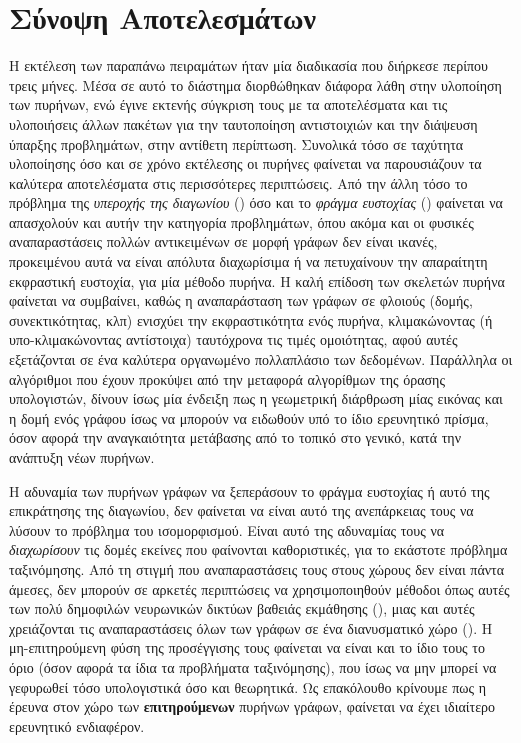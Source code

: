 \section{Σύνοψη Αποτελεσμάτων}
Η εκτέλεση των παραπάνω πειραμάτων ήταν μία διαδικασία που διήρκεσε περίπου τρεις μήνες.
Μέσα σε αυτό το διάστημα διορθώθηκαν διάφορα λάθη στην υλοποίηση των πυρήνων, ενώ έγινε εκτενής σύγκριση τους με τα αποτελέσματα και τις υλοποιήσεις άλλων πακέτων για την ταυτοποίηση αντιστοιχιών και την διάψευση ύπαρξης προβλημάτων, στην αντίθετη περίπτωση.
Συνολικά τόσο σε ταχύτητα υλοποίησης όσο και σε χρόνο εκτέλεσης οι πυρήνες  φαίνεται να παρουσιάζουν τα καλύτερα αποτελέσματα στις περισσότερες περιπτώσεις.
Από την άλλη τόσο το πρόβλημα της \textit{υπεροχής της διαγωνίου} () όσο και το \textit{φράγμα ευστοχίας} () φαίνεται να απασχολούν και αυτήν την κατηγορία προβλημάτων, όπου ακόμα και οι φυσικές αναπαραστάσεις πολλών αντικειμένων σε μορφή γράφων δεν είναι ικανές, προκειμένου αυτά να είναι απόλυτα διαχωρίσιμα ή να πετυχαίνουν την απαραίτητη εκφραστική ευστοχία, για μία μέθοδο πυρήνα.
Η καλή επίδοση των σκελετών πυρήνα φαίνεται να συμβαίνει, καθώς η αναπαράσταση των γράφων σε φλοιούς (δομής, συνεκτικότητας, κλπ) ενισχύει την εκφραστικότητα ενός πυρήνα, κλιμακώνοντας (ή υπο-κλιμακώνοντας αντίστοιχα) ταυτόχρονα τις τιμές ομοιότητας, αφού αυτές εξετάζονται σε ένα καλύτερα οργανωμένο πολλαπλάσιο των δεδομένων.
Παράλληλα οι αλγόριθμοι  που έχουν προκύψει από την μεταφορά αλγορίθμων της όρασης υπολογιστών, δίνουν ίσως μία ένδειξη πως η γεωμετρική διάρθρωση μίας εικόνας και η δομή ενός γράφου ίσως να μπορούν να ειδωθούν υπό το ίδιο ερευνητικό πρίσμα, όσον αφορά την αναγκαιότητα μετάβασης από το τοπικό στο γενικό, κατά την ανάπτυξη νέων πυρήνων.\par
Η αδυναμία των πυρήνων γράφων να ξεπεράσουν το φράγμα ευστοχίας ή αυτό της επικράτησης της διαγωνίου, δεν φαίνεται να είναι αυτό της ανεπάρκειας τους να λύσουν το πρόβλημα του ισομορφισμού.
Είναι αυτό της αδυναμίας τους να \textit{διαχωρίσουν} τις δομές εκείνες που φαίνονται καθοριστικές, για το εκάστοτε πρόβλημα ταξινόμησης.
Από τη στιγμή που αναπαραστάσεις τους στους χώρους  δεν είναι πάντα άμεσες, δεν μπορούν σε αρκετές περιπτώσεις  να χρησιμοποιηθούν μέθοδοι όπως αυτές των πολύ δημοφιλών νευρωνικών δικτύων βαθειάς εκμάθησης (), μιας και αυτές χρειάζονται τις αναπαραστάσεις όλων των γράφων σε ένα διανυσματικό χώρο ().
Η μη-επιτηρούμενη φύση της προσέγγισης τους φαίνεται να είναι και το ίδιο τους το όριο (όσον αφορά τα ίδια τα προβλήματα ταξινόμησης), που ίσως να μην μπορεί να γεφυρωθεί τόσο υπολογιστικά όσο και θεωρητικά.
Ως επακόλουθο κρίνουμε πως η έρευνα στον χώρο των \textbf{επιτηρούμενων} πυρήνων γράφων, φαίνεται να έχει ιδιαίτερο ερευνητικό ενδιαφέρον.
